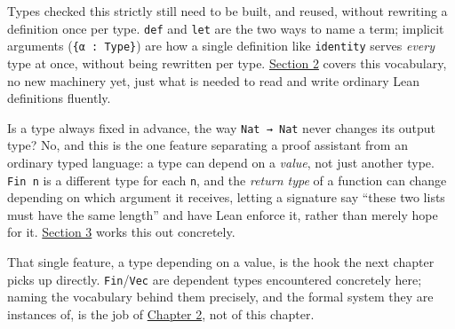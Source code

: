 Types checked this strictly still need to be built, and reused, without rewriting a definition once per type. \texttt{def} and \texttt{let} are the two ways to name a term; implicit arguments (\texttt{\{α : Type\}}) are how a single definition like \texttt{identity} serves \emph{every} type at once, without being rewritten per type. \hyperref[sec:01-basics:02-def-let-implicit:1]{Section 2} covers this vocabulary, no new machinery yet, just what is needed to read and write ordinary Lean definitions fluently.

Is a type always fixed in advance, the way \texttt{Nat → Nat} never changes its output type? No, and this is the one feature separating a proof assistant from an ordinary typed language: a type can depend on a \emph{value}, not just another type. \texttt{Fin n} is a different type for each \texttt{n}, and the \emph{return type} of a function can change depending on which argument it receives, letting a signature say ``these two lists must have the same length'' and have Lean enforce it, rather than merely hope for it. \hyperref[sec:01-basics:03-dependent-types:1]{Section 3} works this out concretely.

That single feature, a type depending on a value, is the hook the next chapter picks up directly. \texttt{Fin}/\texttt{Vec} are dependent types encountered concretely here; naming the vocabulary behind them precisely, and the formal system they are instances of, is the job of \hyperref[sec:02-terminology-and-coc:00-index:1]{Chapter 2}, not of this chapter.






